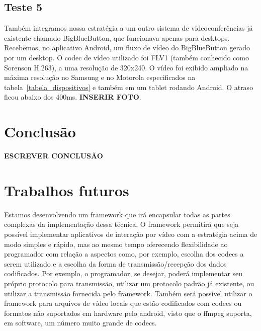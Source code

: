 \documentclass{acm_proc_article-sp}
\newcommand{\todo}[1]{\textcolor[rgb]{1.00,0.00,0.00}{\bf \uppercase{#1}}}
\begin{document}
\subsection{Teste 5}
Também integramos nossa estratégia a um outro sistema de videoconferências já existente chamado BigBlueButton, que funcionava apenas para desktops. Recebemos, no aplicativo Android, um fluxo de vídeo do BigBlueButton gerado por um desktop. O codec de vídeo utilizado foi FLV1 (também conhecido como Sorenson H.263), a uma resolução de 320x240. O vídeo foi exibido ampliado na máxima resolução no Samsung e no Motorola especificados na tabela~\ref{tabela_dispositivos} e também em um tablet rodando Android. O atraso ficou abaixo dos 400ms. \todo{inserir foto}.


\section{Conclusão}

\todo{escrever conclusão}

\section{Trabalhos futuros}

Estamos desenvolvendo um framework que irá encapsular todas as partes complexas da implementação dessa técnica. O framework permitirá que seja possível implementar aplicativos de interação por vídeo com a estratégia acima de modo simples e rápido, mas ao mesmo tempo oferecendo flexibilidade ao programador com relação a aspectos como, por exemplo, escolha dos codecs a serem utilizado e a escolha da forma de transmissão/recepção dos dados codificados. Por exemplo, o programador, se desejar, poderá implementar seu próprio protocolo para transmissão, utilizar um protocolo padrão já existente, ou utilizar a transmissão fornecida pelo framework. Também será possível utilizar o framework para arquivos de vídeo locais que estão codificados com codecs ou formatos não suportados em hardware pelo android, visto que o ffmpeg suporta, em software, um número muito grande de codecs.

%

%
%
\balancecolumns
\end{document}
